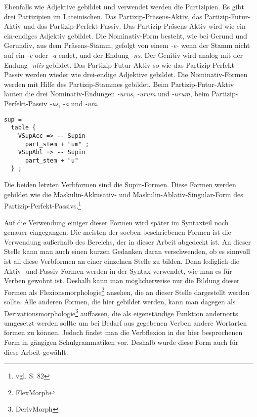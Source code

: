 Ebenfalls wie Adjektive gebildet und verwendet werden die Partizipien. Es gibt drei Partizipien im Lateinischen. Das Partizip-Präsens-Aktiv, das Partizip-Futur-Aktiv und das Partizip-Perfekt-Passiv. Das Partizip-Präsens-Aktiv wird wie ein ein-endiges Adjektiv gebildet. Die Nominativ-Form besteht, wie bei Gerund und Gerundiv, aus dem Präsens-Stamm, gefolgt von einem \textit{-e-} wenn der Stamm nicht auf ein \textit{-e} oder \textit{-a} endet, und der Endung \textit{-ns}. Der Genitiv wird analog mit der Endung \textit{-ntis} gebildet. Das Partizip-Futur-Aktiv so wie das Partizip-Perfekt-Passiv werden wieder wie drei-endige Adjektive gebildet. Die Nominativ-Formen werden mit Hilfe des Partizip-Stammes gebildet. Beim Partizip-Futur-Aktiv lauten die drei Nominativ-Endungen \textit{-urus}, \textit{-urum} und \textit{-urum}, beim Partizip-Perfekt-Passiv \textit{-us}, \textit{-a} und \textit{-um}.
\begin{lstlisting}[float=h!tp,caption={Ausschnitt aus der Funktion \texttt{mkVerb} um Supin-Verbformen zu bilden (vgl. \textbf{ResLat.gf})},label={GF-Res-MkVerb-Sup},basicstyle=\small]
sup = 
  table {
    VSupAcc => -- Supin
      part_stem + "um" ;
    VSupAbl => -- Supin
      part_stem + "u" 
  } ;
\end{lstlisting}
Die beiden letzten Verbformen sind die Supin-Formen. Diese Formen werden gebildet wie die Maskulin-Akkusativ- und Maskulin-Ablativ-Singular-Form des Partizip-Perfekt-Passivs.\footnote{vgl. \cite{BAYER-LINDAUER1994} S. 82} \par
Auf die Verwendung einiger dieser Formen wird später im Syntaxteil noch genauer eingegangen. Die meisten der soeben beschriebenen Formen ist die Verwendung außerhalb des Bereichs, der in dieser Arbeit abgedeckt ist. An dieser Stelle kann man auch einen kurzen Gedanken daran verschwenden, ob es sinnvoll ist all diese Verbformen an einer einzelnen Stelle zu bilden. Denn lediglich die Aktiv- und Passiv-Formen werden in der Syntax verwendet, wie man es für Verben gewohnt ist. Deshalb kann man möglicherweise nur die Bildung dieser Formen als Flexionsmorphologie\footnote{FlexMorph} ansehen, die an dieser Stelle dargestellt werden sollte. Alle anderen Formen, die hier gebildet werden, kann man dagegen als Derivationsmorphologie\footnote{DerivMorph} auffassen, die als eigenständige Funktion andernorts umgesetzt werden sollte um bei Bedarf aus gegebenen Verben andere Wortarten formen zu können. Jedoch findet man die Verbflexion in der hier besprochenen Form in gängigen Schulgrammatiken vor. Deshalb wurde diese Form auch für diese Arbeit gewählt. %
\FloatBarrier
